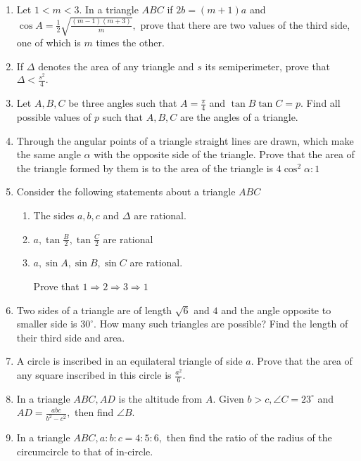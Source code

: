 \begin{enumerate}
\item Let $1<m<3.$ In a triangle $ABC$ if $2b = (m + 1)a$ and $\cos A = \frac{1}{2}\sqrt{\frac{(m - 1)(m +
   3)}{m}},$ prove that there are two values of the third side, one of which is $m$ times the other.

\item If $\Delta$ denotes the area of any triangle and $s$ its semiperimeter, prove that $\Delta < \frac{s^2}{4}.$

\item Let $A, B, C$ be three angles such that $A = \frac{\pi}{4}$ and $\tan B\tan C = p.$ Find all possible
   values of $p$ such that $A, B, C$ are the angles of a triangle.

\item Through the angular points of a triangle straight lines are drawn, which make the same angle $\alpha$ with the opposite
   side of the triangle. Prove that the area of the triangle formed by them is to the area of the triangle is
   $4\cos^2\alpha:1$

\item Consider the following statements about a triangle $ABC$
  \begin{enumerate}
   \item The sides $a,b,c$ and $\Delta$ are rational.

   \item $a, \tan\frac{B}{2}, \tan\frac{ C}{2}$ are rational

   \item $a, \sin A, \sin B, \sin C$ are rational.

   Prove that $1 \Rightarrow 2 \Rightarrow 3 \Rightarrow 1$
   \end{enumerate}
\item Two sides of a triangle are of length $\sqrt{6}$ and $4$ and the angle opposite to smaller side is $30^\circ.$
   How many such triangles are possible? Find the length of their third side and area.

\item A circle is inscribed in an equilateral triangle of side $a.$ Prove that the area of any square inscribed in this circle
   is $\frac{a^2}{6}.$

\item In a triangle $ABC, AD$ is the altitude from $A.$ Given $b > c, \angle C = 23^\circ$ and $AD =
   \frac{abc}{b^2 - c^2},$ then find $\angle B.$

\item In a triangle $ABC, a:b:c = 4:5:6,$ then find the ratio of the radius of the circumcircle to that of in-circle.


\end{enumerate}
